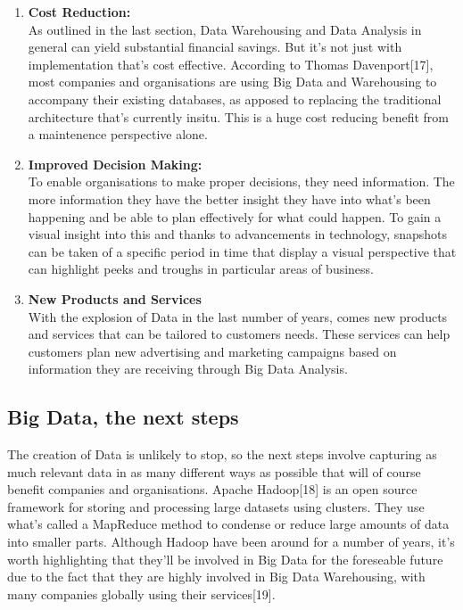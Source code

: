 \documentclass[10pt,journal,compsoc]{IEEEtran}
\begin{document}
\begin{enumerate}
	\item \textbf{Cost Reduction:}\\ As outlined in the last section, Data Warehousing  and Data Analysis in general can yield substantial financial savings. But it's not just with implementation that's cost effective. According to Thomas Davenport[17], most companies and organisations are using Big Data and Warehousing to accompany their existing databases, as apposed to replacing the traditional architecture that's currently insitu. This is a huge cost reducing benefit from a maintenence perspective alone. \\
	
	\item \textbf{Improved Decision Making:}\\ To enable organisations to make proper decisions, they need information. The more information they have the better insight they have into what's been happening and be able to plan effectively for what could happen. To gain a visual insight into this and thanks to advancements in technology, snapshots can be taken of a specific period in time that display a visual perspective that can highlight peeks and troughs in particular areas of business. \\
	
	\item \textbf{New Products and Services}\\ With the explosion of Data in the last number of years, comes new products and services that can be tailored to customers needs. These services can help customers plan new advertising and marketing campaigns based on information they are receiving through Big Data Analysis. 
	 
\end{enumerate}


\subsection{Big Data, the next steps}
The creation of Data is unlikely to stop, so the next steps involve capturing as much relevant data in as many different ways as possible that will of course benefit companies and organisations. Apache Hadoop[18] is an open source framework for storing and processing large datasets using clusters. They use what's called a MapReduce method to condense or reduce large amounts of data into smaller parts. Although Hadoop have been around for a number of years, it's worth highlighting that they'll be involved in Big Data for the foreseable future due to the fact that they are highly involved in Big Data Warehousing, with many companies globally using their services[19]. \\
\end{document}
